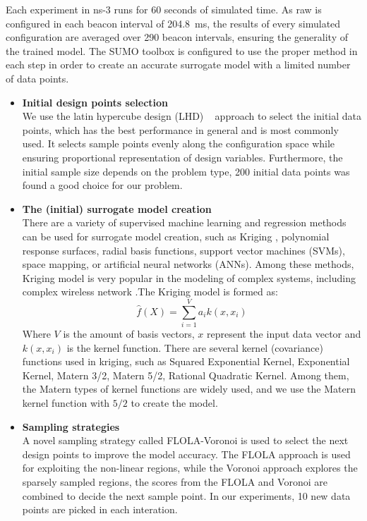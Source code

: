 Each experiment in ns-3 runs for 60 seconds of simulated time. As \gls{raw} is configured in each beacon interval of 204.8~ms, the results of every simulated configuration are averaged over 290 beacon intervals, ensuring the generality of the trained model.
The SUMO toolbox is configured to use the proper method in each step in order to create an accurate surrogate model with a limited number of data points. 


\begin{itemize}
\item \textbf{Initial design points selection}  \\
 We use the latin hypercube design (LHD) ~\cite{FAViana2013} approach to select the initial data points, which has the best performance in general and is  most commonly used. It selects sample points evenly along the configuration space while ensuring proportional representation of design variables. Furthermore, the initial sample size depends on the problem type, 200 initial data points was found a good choice for our problem.
 
\item \textbf{The (initial) surrogate model creation}  \\
There are a variety of supervised machine learning and regression methods can be used for surrogate model creation, such as Kriging \cite{forrester2008engineering}, polynomial response surfaces, radial basis functions, support vector machines (SVMs),  space mapping, or artificial neural networks (ANNs). Among these methods, Kriging model is 
very popular in the modeling of  complex systems, including complex wireless network \cite{SUMOWirelessConferencing,wowmom2018, LTEoptimization}.The Kriging model is formed as:
\begin{equation}
\hat{f} (X) = \sum_{i=1}^{V} {a_i}{k(x, x_i)}
\end{equation}
Where $V$ is the amount of basis vectors, $x$ represent the input data vector and $k(x, x_i)$ is the kernel function. There are several kernel (covariance) functions used in kriging, such as Squared Exponential Kernel, Exponential Kernel, Matern 3/2, Matern 5/2, Rational Quadratic Kernel. Among them, the Matern types of kernel functions are  widely used, and we use the Matern kernel function with %
$5/2$ to create the model. 

\item \textbf{Sampling strategies} \\
A novel sampling strategy called FLOLA-Voronoi \cite{vanderherten2015} is used to select the next design points to improve the model accuracy.  The FLOLA approach is used for exploiting the non-linear regions, while the Voronoi approach explores the sparsely sampled regions, the scores from  the FLOLA and Voronoi are combined to decide the next sample point. In our experiments, 10 new data points are picked in each interation.


\end{itemize}
